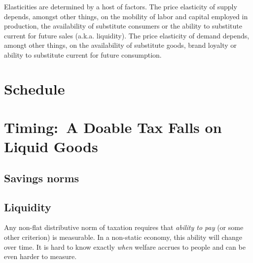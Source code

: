 Elasticities are determined by a host of factors.
The price elasticity of supply depends, amongst other things, on the mobility of labor and capital employed in production, the availability of substitute consumers or the ability to substitute current for future sales (a.k.a.
liquidity).
The price elasticity of demand depends, amongt other things, on the availability of substitute goods, brand loyalty or ability to substitute current for future consumption.

\section[Schedule]{Schedule} \label{sec:tax-schedule}


\section[Timing]{Timing:~A Doable Tax Falls on Liquid Goods} \label{sec:tax-timing} %

\subsection{Savings norms}


\subsection{Liquidity}



Any non-flat distributive norm of taxation requires that \emph{ability to pay} (or some other criterion) is measurable.
  In a non-static economy, this ability will change over time.
It is hard to know exactly \emph{when} welfare accrues to people and can be even harder to measure.

